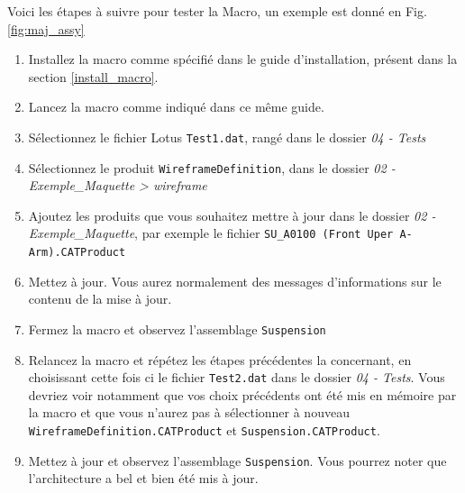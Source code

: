 Voici les étapes à suivre pour tester la Macro, un exemple est donné en Fig. \ref{fig:maj_assy}
\begin{enumerate}
    \item Installez la macro comme spécifié dans le guide d'installation, présent dans la section \ref{install_macro}.
    \item Lancez la macro comme indiqué dans ce même guide.
    \item Sélectionnez le fichier Lotus \texttt{Test1.dat}, rangé dans le dossier \textit{04 - Tests}
    \item Sélectionnez le produit \texttt{WireframeDefinition}, dans le dossier \textit{02 - Exemple\_Maquette > wireframe}
    \item Ajoutez les produits que vous souhaitez mettre à jour dans le dossier \textit{02 - Exemple\_Maquette}, par exemple le fichier \texttt{SU\_A0100 (Front Uper A-Arm).CATProduct}
    \item Mettez à jour. Vous aurez normalement des messages d'informations sur le contenu de la mise à jour.
    \item Fermez la macro et observez l'assemblage \texttt{Suspension}
    \item Relancez la macro et répétez les étapes précédentes la concernant, en choisissant cette fois ci le fichier \texttt{Test2.dat} dans le dossier \textit{04 - Tests}. Vous devriez voir notamment que vos choix précédents ont été mis en mémoire par la macro et que vous n'aurez pas à sélectionner à nouveau \texttt{WireframeDefinition.CATProduct} et \texttt{Suspension.CATProduct}.
    \item Mettez à jour et observez l'assemblage \texttt{Suspension}. Vous pourrez noter que l'architecture a bel et bien été mis à jour.
\end{enumerate}

